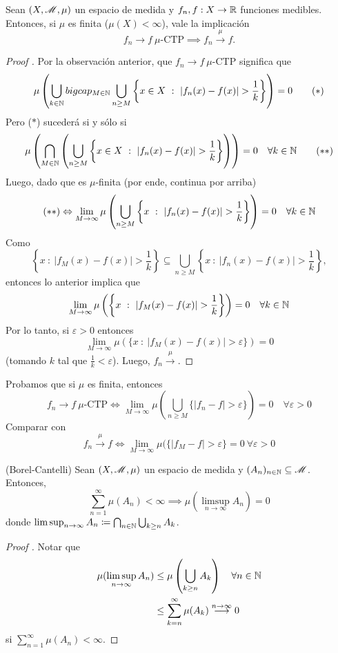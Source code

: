 \begin{prop}
	Sean $(X, \mathscr{M}, \mu)$ un espacio de medida y $f_n, f : X \to \mathbb{R}$ funciones medibles. Entonces, si $\mu$ es finita ($\mu(X) < \infty$), vale la implicación
	\[ f_n \longrightarrow f \ \mu \text{-CTP} \implies f_n \stackrel{\mu}{\longrightarrow} f. \]
\end{prop}
\begin{proof}[Proof ]
	Por la observación anterior, que $f_n \longrightarrow f \ \mu$-CTP significa que
	\[ \mu \left( \bigcup_{k\in\mathbb{N}} bigcap_{M\in\mathbb{N}} \bigcup_{n \geq M} \left\{x \in X \ : \ | f_n(x) - f(x) | > \frac{1}{k}\right\} \right) = 0 \tag{$*$} \]
	Pero ($*$) sucederá si y sólo si
	\[ \mu \left( \bigcap_{M\in\mathbb{N}} \left( \bigcup_{n \geq M} \left\{x \in X \ : \ | f_n(x) - f(x) | > \frac{1}{k}\right\} \right) \right) = 0 \quad \forall k \in \mathbb{N} \tag{$**$} \]
	Luego, dado que  es $\mu$-finita (por ende, continua por arriba)
	\[ (**) \Leftrightarrow \lim_{M \to \infty} \mu \left( \bigcup_{n \geq M} \left\{x \ : \ | f_n(x) - f(x) | > \frac{1}{k}\right\} \right) = 0 \quad \forall k \in \mathbb{N} \]
	Como
	\[ \left\{x \ : \ | f_M(x) - f(x) | > \frac{1}{k}\right\} \subseteq \bigcup_{n \geq M} \left\{x \ : \ | f_n(x) - f(x) | > \frac{1}{k}\right\}, \]
	entonces lo anterior implica que
	\[ \lim_{M \to \infty} \mu \left( \left\{x \ : \ |f_M(x) - f(x) | > \frac{1}{k}\right\} \right) = 0 \quad \forall k \in \mathbb{N} \]
	Por lo tanto, si $\varepsilon > 0$ entonces
	\[ \lim_{M \to \infty} \mu(\{x \ : \ | f_M(x) - f(x) | > \varepsilon\}) = 0 \]
	(tomando $k$ tal que $\frac{1}{k} < \varepsilon$). Luego, $f_n \stackrel{\mu}{\longrightarrow}$.
\end{proof}

\begin{remark}
	Probamos que si $\mu$ es finita, entonces
	\[ f_n \longrightarrow{} f \ \mu \text{-CTP} \iff \lim_{M \to \infty} \mu \left( \bigcup_{n \geq M} \{| f_n - f | > \varepsilon\} \right) = 0 \quad \forall \varepsilon > 0 \]
	Comparar con
	\[ f_n \stackrel{\mu}{\longrightarrow} f \iff \lim_{M \to \infty} \mu(\{| f_M - f | > \varepsilon\} = 0 \ \forall \varepsilon > 0 \]
\end{remark}

\begin{lemma}(Borel-Cantelli)
	Sean $(X, \mathscr{M}, \mu)$ un espacio de medida y $(A_n)_{n\in\mathbb{N}} \subseteq \mathscr{M}$. Entonces,
	\[ \sum_{n=1}^{\infty} \mu(A_n) < \infty \implies \mu(\limsup_{n \to \infty} A_n) = 0 \]
	donde $\limsup_{n \to \infty} A_n \coloneq \bigcap_{n\in\mathbb{N}} \bigcup_{k \geq n} A_k$.
\end{lemma}
\begin{proof}[Proof ]
	Notar que
	\begin{align*}
		\mu(\limsup_{n \to \infty} A_n) &\leq \mu \left( \bigcup_{k \geq n} A_k \right) \quad \forall n \in \mathbb{N} \\
		&\leq \sum_{k=n}^{\infty} \mu(A_k) \stackrel{n \to \infty}{\longrightarrow} 0
	\end{align*}
	si $\sum_{n=1}^{\infty} \mu(A_{n}) < \infty$.
\end{proof}
